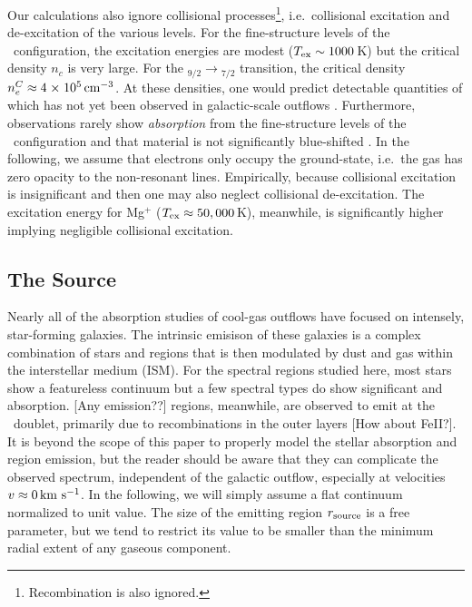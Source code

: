 \documentclass[12pt,preprint]{aastex}
\begin{document}
Our calculations also ignore collisional
processes\footnote{Recombination is also ignored.}, i.e.\ collisional
excitation and de-excitation of the various levels.  For the
fine-structure levels of the \aconfig\ configuration, the excitation
energies are modest ($T_{\rm ex} \sim 1000$\,K) but the critical
density $n_c$ is very large.  For the \aconfig$_{9/2} \to
$\aconfig$_{7/2}$ transition, the critical density $n_e^C \approx 4
{\; \times \; 10^{5}} \, {\rm cm^{-3}}$.  At these densities, one would predict  
detectable quantities of  which has not yet been observed
in galactic-scale outflows
\citep[see also][]{pcb06}.  Furthermore, observations rarely show
{\it absorption} from the
fine-structure levels of the \aconfig\ configuration and that material
is not significantly blue-shifted \citep{rubin+10}.
In the following, we assume that electrons only occupy the
ground-state, i.e.\ the gas has zero opacity to the non-resonant
lines.
Empirically, because collisional excitation is insignificant and
then one may also neglect collisional de-excitation.  
The excitation energy for Mg$^+$ ($T_{\rm ex} \approx 50,000$\,K),  
meanwhile, is significantly higher implying 
negligible collisional excitation. 

\subsection{The Source}

Nearly all of the absorption studies of cool-gas outflows 
have focused on intensely, star-forming galaxies.  The
intrinsic emisison of these galaxies is a complex combination of
stars and  regions that is then modulated by dust and gas
within the interstellar medium (ISM).  For the spectral regions studied
here, most stars show a featureless continuum but a few spectral
types do show significant  and  absorption.
[Any emission??]   regions, meanwhile, are observed to emit
at the \mgiid\ doublet, primarily due to recombinations in the outer
layers [How about FeII?].  It is beyond the scope of this paper to
properly model the 
stellar absorption and  region emission, but the reader
should be aware that they can complicate the observed spectrum,
independent of the galactic outflow, especially at velocities $v \approx 0 \, {\rm km~s^{-1}}$.
In the following, we will simply assume a flat continuum 
normalized to unit value.  The size of the emitting
region $r_{\rm source}$ is a free parameter, but we tend to
restrict its value to be smaller than the minimum radial extent of any
gaseous component.
\end{document}
